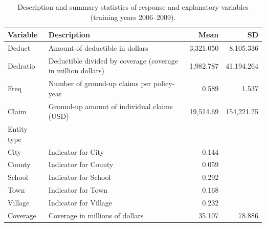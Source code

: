 \begin{table}[h!]
\centering
\begin{tabular}{llrr}
\toprule
Variable & Description & Mean & SD \\
\midrule
Deduct & Amount of deductible in dollars & 3,321.050 & 8,105.336 \\
Dedratio & Deductible divided by coverage (coverage in million dollars) & 1,982.787 & 41,194.264 \\
Freq & Number of ground-up claims per policy-year & 0.589 & 1.537 \\
Claim & Ground-up amount of individual claims (USD) & 19,514.69 & 154,221.25 \\
Entity type &  &  &  \\
City & Indicator for City & 0.144 &  \\
County & Indicator for County & 0.059 &  \\
School & Indicator for School & 0.292 &  \\
Town & Indicator for Town & 0.168 &  \\
Village & Indicator for Village & 0.232 &  \\
Coverage & Coverage in millions of dollars & 35.107 & 78.886 \\
\bottomrule
\end{tabular}
\caption{Description and summary statistics of response and explanatory variables (training years 2006--2009).}
\label{tab:lgpif summary}
\end{table}
